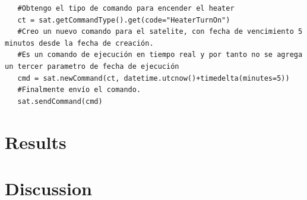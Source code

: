 \documentclass[twoside,twocolumn]{article}
\begin{document}
{{\begin{verbatim}
   #Obtengo el tipo de comando para encender el heater
   ct = sat.getCommandType().get(code="HeaterTurnOn")
   #Creo un nuevo comando para el satelite, con fecha de vencimiento 5 minutos desde la fecha de creación. 
   #Es un comando de ejecución en tiempo real y por tanto no se agrega un tercer parametro de fecha de ejecución
   cmd = sat.newCommand(ct, datetime.utcnow()+timedelta(minutes=5))
   #Finalmente envío el comando.
   sat.sendCommand(cmd)
\end{verbatim}



\section{Results}




% 



\section{Discussion}		






}}
\end{document}
